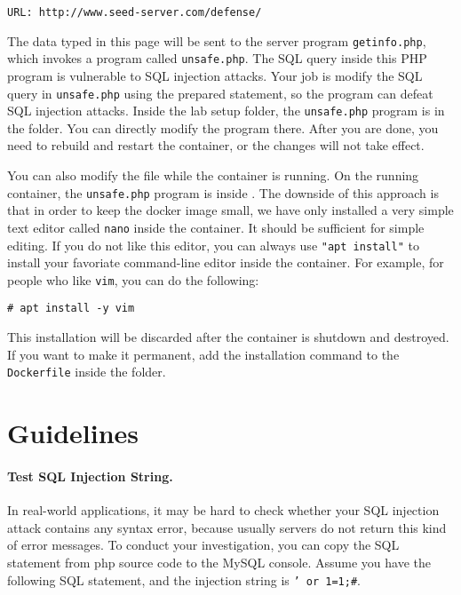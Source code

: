 \begin{lstlisting}
URL: http://www.seed-server.com/defense/
\end{lstlisting}

The data typed in this page will be sent to the 
server program \texttt{getinfo.php}, which 
invokes a program called \texttt{unsafe.php}. 
The SQL query inside this PHP program 
is vulnerable to SQL injection attacks. Your job is modify the SQL 
query in \texttt{unsafe.php} using the prepared statement, so
the program can defeat SQL injection attacks.
Inside the lab setup folder, the \texttt{unsafe.php} program is 
in the  folder. You can directly 
modify the program there. After you are done, you need
to rebuild and restart the container, or the changes will not
take effect. 

You can also modify the file while the container is running.
On the running container, the \texttt{unsafe.php} program is 
inside . 
The downside of this
approach is that in order to keep the docker image small,
we have only installed a very simple text editor called \texttt{nano}
inside the container. It should be sufficient for simple editing.
If you do not like this editor, you can always use \texttt{"apt install"} to install
your favoriate command-line editor inside the container. For example,
for people who like \texttt{vim}, you can do the following:

\begin{lstlisting}
# apt install -y vim 
\end{lstlisting}

This installation will be discarded after the container is shutdown and destroyed.
If you want to make it permanent, add the installation command to the \texttt{Dockerfile} 
inside the  folder. 
 


\section{Guidelines}
\label{sec:guidelines}

\paragraph{Test SQL Injection String.}
In real-world applications, it may be hard to check whether your SQL injection attack contains
any syntax error, because usually servers do not return this kind of error messages. 
To conduct your investigation, you can copy the SQL statement from php source code to the MySQL console. 
Assume you have the following SQL statement, and the injection string is {\tt ' or 1=1;\#}. 

